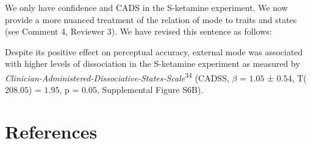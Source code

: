 \documentclass[
]{article}
\begin{document}
We only have confidence and CADS in the S-ketamine experiment. We now
provide a more nuanced treatment of the relation of mode to traits and
states (see Comment 4, Reviewer 3). We have revised this sentence as
follows:

Despite its positive effect on perceptual accuracy, external mode was
associated with higher levels of dissociation in the S-ketamine
experiment as measured by
\emph{Clinician-Administered-Dissociative-States-Scale}\textsuperscript{34}
(CADSS, \(\beta\) = \(1.05\) ± \(0.54\), T(\(208.05\)) = \(1.95\), p =
\(0.05\), Supplemental Figure S6B).

\newpage

\section*{References}\label{references}
\end{document}
